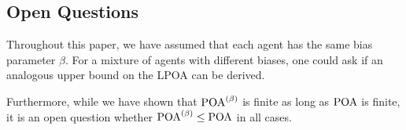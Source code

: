 \documentclass[twoside]{article}
\begin{document}
\begin{multicols}{2}
\section{Open Questions}
Throughout this paper, we have assumed that each agent has the same bias
parameter $\beta$. For a mixture of agents with different biases, one could ask
if an analogous upper bound on the LPOA can be derived.

Furthermore, while we have shown that $\text{POA}^{(\beta)}$ is finite as long as $\text{POA}$ is
finite, it is an open question whether $\text{POA}^{(\beta)} \le \text{POA}$ in all cases.

\printbibliography






\end{multicols}
\end{document}
